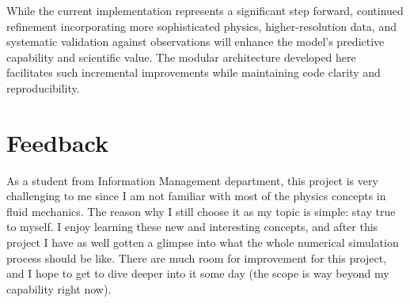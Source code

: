 \documentclass[12pt]{article}
\begin{document}
While the current implementation represents a significant step forward, continued refinement incorporating more sophisticated physics, higher-resolution data, and systematic validation against observations will enhance the model's predictive capability and scientific value. The modular architecture developed here facilitates such incremental improvements while maintaining code clarity and reproducibility.

\section*{Feedback}

As a student from Information Management department, this project is very challenging to me since I am not familiar with most of the physics concepts in fluid mechanics. The reason why I still choose it as my topic is simple: stay true to myself. I enjoy learning these new and interesting concepts, and after this project I have as well gotten a glimpse into what the whole numerical simulation process should be like. There are much room for improvement for this project, and I hope to get to dive deeper into it some day (the scope is way beyond my capability right now).
\end{document}
